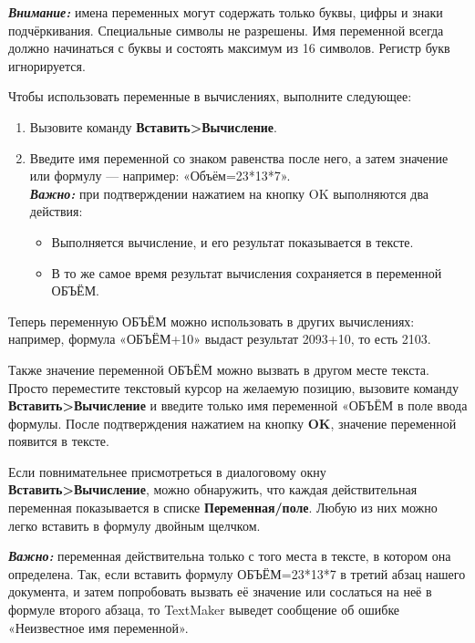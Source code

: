 ﻿\documentclass[a4paper,10pt]{article}
\begin{document}
\begin{mdframed}[backgroundcolor=blue!10]
\textbf{\textit{Внимание:}} имена переменных могут содержать только буквы, цифры и знаки подчёркивания. Специальные символы не разрешены. Имя переменной всегда должно начинаться с буквы и состоять максимум из 16 символов. Регистр букв игнорируется.
\end{mdframed}

Чтобы использовать переменные в вычислениях, выполните следующее:
\begin{enumerate}
 \item Вызовите команду \textbf{Вставить>Вычисление}.
 \item Введите имя переменной со знаком равенства после него, а затем значение или формулу — например: «Объём=23*13*7».\\
 \textbf{\textit{Важно:}} при подтверждении нажатием на кнопку OK выполняются два действия:
 \begin{itemize}
  \item Выполняется вычисление, и его результат показывается в тексте.
  \item В то же самое время результат вычисления сохраняется в переменной ОБЪЁМ.
 \end{itemize}
\end{enumerate}

Теперь переменную ОБЪЁМ можно использовать в других вычислениях: например, формула «ОБЪЁМ+10» выдаст результат 2093+10, то есть 2103.

Также значение переменной ОБЪЁМ можно вызвать в другом месте текста. Просто переместите текстовый курсор на желаемую позицию, вызовите команду \textbf{Вставить>Вычисление} и введите только имя переменной «ОБЪЁМ в поле ввода формулы. После подтверждения нажатием на кнопку \textbf{OK}, значение переменной появится в тексте.

Если повнимательнее присмотреться в диалоговому окну \textbf{Вставить>Вычисление}, можно обнаружить, что каждая действительная переменная показывается в списке \textbf{Переменная/поле}. Любую из них можно легко вставить в формулу двойным щелчком.

\begin{mdframed}[backgroundcolor=blue!10]
\textbf{\textit{Важно:}} переменная действительна только с того места в тексте, в котором она определена. Так, если вставить формулу ОБЪЁМ=23*13*7 в третий абзац нашего документа, и затем попробовать вызвать её значение или сослаться на неё в формуле второго абзаца, то TextMaker выведет сообщение об ошибке «Неизвестное имя переменной».
\end{mdframed}
\end{document}
